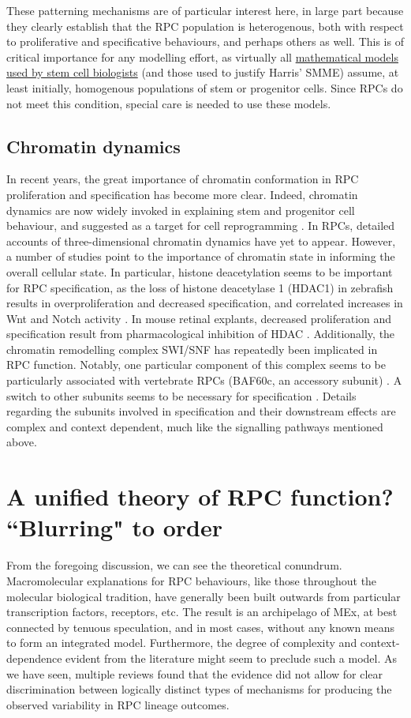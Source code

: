 These patterning mechanisms are of particular interest here, in large part because they clearly establish that the RPC population is heterogenous, both with respect to proliferative and specificative behaviours, and perhaps others as well. This is of critical importance for any modelling effort, as virtually all \hyperref[ssec:SSM]{mathematical models used by stem cell biologists} (and those used to justify Harris' SMME) assume, at least initially, homogenous populations of stem or progenitor cells. Since RPCs do not meet this condition, special care is needed to use these models.

\subsection{Chromatin dynamics}

In recent years, the great importance of chromatin conformation in RPC proliferation and specification has become more clear. Indeed, chromatin dynamics are now widely invoked in explaining stem and progenitor cell behaviour, and suggested as a target for cell reprogramming \cite{Kondo2006,Tee2014}. In RPCs, detailed accounts of three-dimensional chromatin dynamics have yet to appear. However, a number of studies point to the importance of chromatin state in informing the overall cellular state. In particular, histone deacetylation seems to be important for RPC specification, as the loss of histone deacetylase 1 (HDAC1) in zebrafish results in overproliferation and decreased specification, and correlated increases in Wnt and Notch activity \cite{Yamaguchi2005}. In mouse retinal explants, decreased proliferation and specification result from  pharmacological inhibition of HDAC \cite{Chen2007}. Additionally, the chromatin remodelling complex SWI/SNF has repeatedly been implicated in RPC function. Notably, one particular component of this complex seems to be particularly associated with vertebrate RPCs (BAF60c, an accessory subunit) \cite{Lamba2008}. A switch to other subunits seems to be necessary for specification \cite{Lessard2007}. Details regarding the subunits involved in specification and their downstream effects are complex and context dependent, much like the signalling pathways mentioned above.

\section{A unified theory of RPC function? ``Blurring" to order}

From the foregoing discussion, we can see the theoretical conundrum. Macromolecular explanations for RPC behaviours, like those throughout the molecular biological tradition, have generally been built outwards from particular transcription factors, receptors, etc. The result is an archipelago of MEx, at best connected by tenuous speculation, and in most cases, without any known means to form an integrated model. Furthermore, the degree of complexity and context-dependence evident from the literature might seem to preclude such a model. As we have seen, multiple reviews found that the evidence did not allow for clear discrimination between logically distinct types of mechanisms for producing the observed variability in RPC lineage outcomes.

